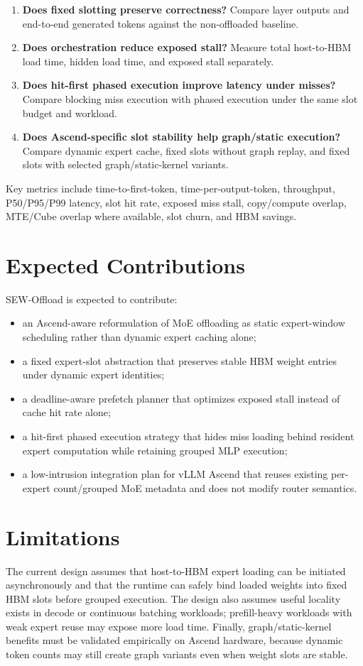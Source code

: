 \documentclass[10pt]{article}
\begin{document}
\begin{enumerate}[leftmargin=*]
  \item \textbf{Does fixed slotting preserve correctness?} Compare layer outputs
  and end-to-end generated tokens against the non-offloaded baseline.
  \item \textbf{Does orchestration reduce exposed stall?} Measure total
  host-to-HBM load time, hidden load time, and exposed stall separately.
  \item \textbf{Does hit-first phased execution improve latency under misses?}
  Compare blocking miss execution with phased execution under the same slot
  budget and workload.
  \item \textbf{Does Ascend-specific slot stability help graph/static execution?}
  Compare dynamic expert cache, fixed slots without graph replay, and fixed
  slots with selected graph/static-kernel variants.
\end{enumerate}

Key metrics include time-to-first-token, time-per-output-token, throughput,
P50/P95/P99 latency, slot hit rate, exposed miss stall, copy/compute overlap,
MTE/Cube overlap where available, slot churn, and HBM savings.

\section{Expected Contributions}

SEW-Offload is expected to contribute:

\begin{itemize}[leftmargin=*]
  \item an Ascend-aware reformulation of MoE offloading as static expert-window
  scheduling rather than dynamic expert caching alone;
  \item a fixed expert-slot abstraction that preserves stable HBM weight
  entries under dynamic expert identities;
  \item a deadline-aware prefetch planner that optimizes exposed stall instead
  of cache hit rate alone;
  \item a hit-first phased execution strategy that hides miss loading behind
  resident expert computation while retaining grouped MLP execution;
  \item a low-intrusion integration plan for vLLM Ascend that reuses existing
  per-expert count/grouped MoE metadata and does not modify router semantics.
\end{itemize}

\section{Limitations}

The current design assumes that host-to-HBM expert loading can be initiated
asynchronously and that the runtime can safely bind loaded weights into fixed
HBM slots before grouped execution. The design also assumes useful locality
exists in decode or continuous batching workloads; prefill-heavy workloads with
weak expert reuse may expose more load time. Finally, graph/static-kernel
benefits must be validated empirically on Ascend hardware, because dynamic
token counts may still create graph variants even when weight slots are stable.
\end{document}
